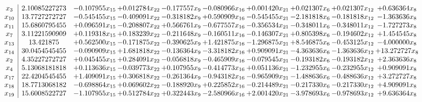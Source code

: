 \documentclass[10pt]{article}
\begin{document}
 \[\begin{array}{c| c c@{\hskip 2pt} c@{\hskip 2pt} c@{\hskip 2pt} c@{\hskip 2pt} c@{\hskip 2pt} c@{\hskip 2pt} c@{\hskip 2pt} c@{\hskip 2pt} }
 x_{3}   &  2.10085227273 & -0.107955 x_{15} & + 0.012784 x_{22} & -0.177557 x_{9} & -0.080966 x_{16} & + 0.001420 x_{21} & + 0.021307 x_{6} & + 0.021307 x_{12} & + 0.636364 x_{8}\\
 x_{10}   &  13.7727272727 & -0.545455 x_{15} & -0.409091 x_{22} & -0.318182 x_{9} & + 0.590909 x_{16} & -0.545455 x_{21} & -2.181818 x_{6} & -0.181818 x_{12} & -1.363636 x_{8}\\
 x_{11}   &  15.6860795455 & + 0.096591 x_{15} & -0.208807 x_{22} & + 0.566761 x_{9} & -0.677557 x_{16} & -0.356534 x_{21} & -0.348011 x_{6} & -0.348011 x_{12} & -1.727273 x_{8}\\
 x_{7}   &  3.11221590909 & + 0.119318 x_{15} & + 0.183239 x_{22} & -0.211648 x_{9} & -0.160511 x_{16} & -0.146307 x_{21} & + 0.805398 x_{6} & -0.194602 x_{12} & + 1.454545 x_{8}\\
 x_{13}   &  13.421875 & + 0.562500 x_{15} & -0.171875 x_{22} & -0.390625 x_{9} & + 1.421875 x_{16} & -1.296875 x_{21} & + 8.546875 x_{6} & -0.453125 x_{12} & -4.000000 x_{8}\\
 x_{14}   &  30.0454545455 & -0.090909 x_{15} & + 1.681818 x_{22} & -0.136364 x_{9} & -3.318182 x_{16} & + 0.909091 x_{21} & -4.363636 x_{6} & -1.363636 x_{12} & + 13.272727 x_{8}\\
 x_{2}   &  4.35227272727 & + 0.045455 x_{15} & + 0.284091 x_{22} & -0.056818 x_{9} & -0.465909 x_{16} & -0.079545 x_{21} & -0.193182 x_{6} & -0.193182 x_{12} & + 2.363636 x_{8}\\
 x_{4}   &  5.13068181818 & + 0.113636 x_{15} & -0.039773 x_{22} & + 0.107955 x_{9} & -0.414773 x_{16} & + 0.051136 x_{21} & -1.232955 x_{6} & -0.232955 x_{12} & + 0.909091 x_{8}\\
 x_{17}   &  22.4204545455 & + 1.409091 x_{15} & + 0.306818 x_{22} & -0.261364 x_{9} & -0.943182 x_{16} & -0.965909 x_{21} & -1.488636 x_{6} & -0.488636 x_{12} & + 3.272727 x_{8}\\
 x_{18}   &  18.7713068182 & -0.698864 x_{15} & + 0.069602 x_{22} & -0.188920 x_{9} & + 0.225852 x_{16} & -0.214489 x_{21} & -0.217330 x_{6} & -0.217330 x_{12} & + 4.909091 x_{8}\\
 x_{19}   &  15.6008522727 & -1.107955 x_{15} & + 0.512784 x_{22} & + 0.322443 x_{9} & -2.580966 x_{16} & + 2.001420 x_{21} & -3.978693 x_{6} & -0.978693 x_{12} & + 9.636364 x_{8}\\

\end{array}\]
\end{document}
